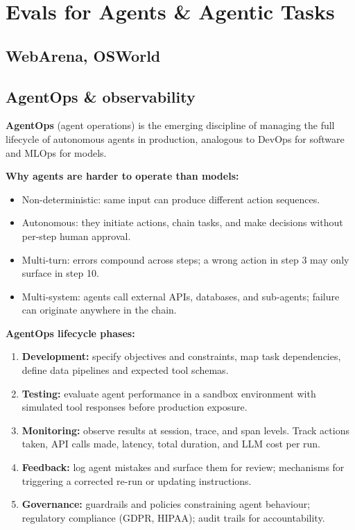 
\section{Evals for Agents \& Agentic Tasks}

\subsection{WebArena, OSWorld}


\subsection{AgentOps \& observability}

\textbf{AgentOps} (agent operations) is the emerging discipline of managing the full
lifecycle of autonomous agents in production, analogous to DevOps for software and
MLOps for models.

\textbf{Why agents are harder to operate than models:}
\begin{itemize}
  \item Non-deterministic: same input can produce different action sequences.
  \item Autonomous: they initiate actions, chain tasks, and make decisions without
    per-step human approval.
  \item Multi-turn: errors compound across steps; a wrong action in step 3 may only
    surface in step 10.
  \item Multi-system: agents call external APIs, databases, and sub-agents; failure
    can originate anywhere in the chain.
\end{itemize}

\textbf{AgentOps lifecycle phases:}
\begin{enumerate}
  \item \textbf{Development:} specify objectives and constraints, map task
    dependencies, define data pipelines and expected tool schemas.
  \item \textbf{Testing:} evaluate agent performance in a sandbox environment with
    simulated tool responses before production exposure.
  \item \textbf{Monitoring:} observe results at session, trace, and span levels. Track
    actions taken, API calls made, latency, total duration, and LLM cost per run.
  \item \textbf{Feedback:} log agent mistakes and surface them for review; mechanisms
    for triggering a corrected re-run or updating instructions.
  \item \textbf{Governance:} guardrails and policies constraining agent behaviour;
    regulatory compliance (GDPR, HIPAA); audit trails for accountability.
\end{enumerate}

